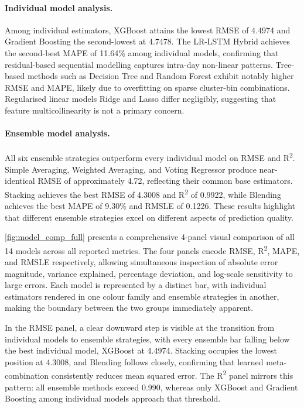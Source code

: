 \documentclass[a4paper,fleqn]{cas-dc}
\begin{document}
\paragraph{Individual model analysis.}  Among individual estimators, XGBoost attains the lowest RMSE of 4.4974 and Gradient Boosting the second-lowest at 4.7478.  The LR-LSTM Hybrid achieves the second-best MAPE of 11.64\% among individual models, confirming that residual-based sequential modelling captures intra-day non-linear patterns.  Tree-based methods such as Decision Tree and Random Forest exhibit notably higher RMSE and MAPE, likely due to overfitting on sparse cluster-bin combinations.  Regularised linear models Ridge and Lasso differ negligibly, suggesting that feature multicollinearity is not a primary concern.

\paragraph{Ensemble model analysis.}  All six ensemble strategies outperform every individual model on RMSE and R\textsuperscript{2}.  Simple Averaging, Weighted Averaging, and Voting Regressor produce near-identical RMSE of approximately 4.72, reflecting their common base estimators.  Stacking achieves the best RMSE of 4.3008 and R\textsuperscript{2} of 0.9922, while Blending achieves the best MAPE of 9.30\% and RMSLE of 0.1226.  These results highlight that different ensemble strategies excel on different aspects of prediction quality.

\autoref{fig:model_comp_full} presents a comprehensive 4-panel visual comparison of all 14 models across all reported metrics.  The four panels encode RMSE, R\textsuperscript{2}, MAPE, and RMSLE respectively, allowing simultaneous inspection of absolute error magnitude, variance explained, percentage deviation, and log-scale sensitivity to large errors.  Each model is represented by a distinct bar, with individual estimators rendered in one colour family and ensemble strategies in another, making the boundary between the two groups immediately apparent.

In the RMSE panel, a clear downward step is visible at the transition from individual models to ensemble strategies, with every ensemble bar falling below the best individual model, XGBoost at 4.4974.  Stacking occupies the lowest position at 4.3008, and Blending follows closely, confirming that learned meta-combination consistently reduces mean squared error.  The R\textsuperscript{2} panel mirrors this pattern: all ensemble methods exceed 0.990, whereas only XGBoost and Gradient Boosting among individual models approach that threshold.
\end{document}
